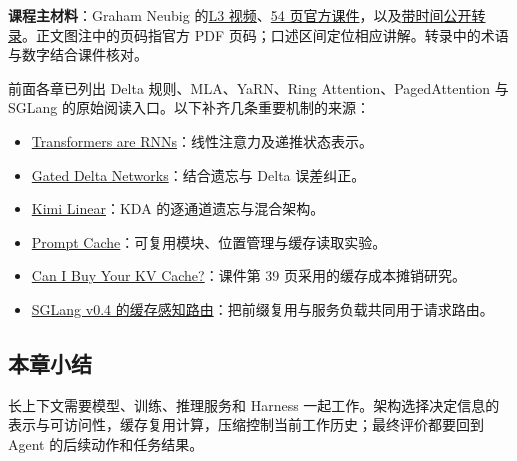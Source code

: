 \documentclass[11pt,a4paper]{article}
\begin{document}
\textbf{课程主材料}：Graham Neubig 的\href{https://www.youtube.com/watch?v=AiwCCvFW1uE}{L3 视频}、\href{https://www.cmu-agents.com/slides/lecture-03-long-context.pdf}{54 页官方课件}，以及\href{https://www.usetranscribe.io/yt/AiwCCvFW1uE/long-context-agents}{带时间公开转录}。正文图注中的页码指官方 PDF 页码；口述区间定位相应讲解。转录中的术语与数字结合课件核对。

前面各章已列出 Delta 规则、MLA、YaRN、Ring Attention、PagedAttention 与 SGLang 的原始阅读入口。以下补齐几条重要机制的来源：
\begin{itemize}
\item \href{https://arxiv.org/abs/2006.16236}{Transformers are RNNs}：线性注意力及递推状态表示。
\item \href{https://arxiv.org/abs/2412.06464}{Gated Delta Networks}：结合遗忘与 Delta 误差纠正。
\item \href{https://arxiv.org/abs/2510.26692}{Kimi Linear}：KDA 的逐通道遗忘与混合架构。
\item \href{https://arxiv.org/abs/2311.04934}{Prompt Cache}：可复用模块、位置管理与缓存读取实验。
\item \href{https://arxiv.org/abs/2606.13361}{Can I Buy Your KV Cache?}：课件第 39 页采用的缓存成本摊销研究。
\item \href{https://lmsys.org/blog/2024-12-04-sglang-v0-4/}{SGLang v0.4 的缓存感知路由}：把前缀复用与服务负载共同用于请求路由。
\end{itemize}

\subsection{本章小结}

长上下文需要模型、训练、推理服务和 Harness 一起工作。架构选择决定信息的表示与可访问性，缓存复用计算，压缩控制当前工作历史；最终评价都要回到 Agent 的后续动作和任务结果。
\end{document}
